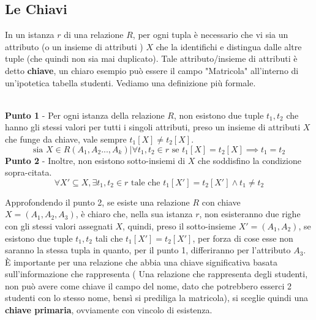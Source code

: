 \documentclass[12pt, letterpaper]{article}
\begin{document}
\subsection{Le Chiavi}
In un istanza \(r\) di una relazione \(R\), per ogni tupla è necessario che vi sia un attributo (o un insieme di attributi ) \(X\)
che la identifichi e distingua dalle altre tuple (che quindi non sia mai duplicato). Tale attributo/insieme di attributi è detto
\textbf{chiave}, un chiaro esempio può essere il campo "Matricola" all'interno di un'ipotetica tabella studenti.
Vediamo una definizione più formale.
\begin{theorem}
    \hphantom{.}\\\textbf{ Punto 1 }- Per ogni istanza della relazione \(R\), non esistono due tuple \(t_1,t_2\) che hanno gli stessi valori
    per tutti i singoli attributi, preso un insieme di attributi \(X\) che funge da chiave, vale sempre \(t_1[X]\ne t_2[X]\).
    \begin{equation}
        \text{sia }X\in R(A_1,A_2...,A_k) | \forall t_1,t_2 \in r \text{ se }t_1[X]=t_2[X] \implies t_1=t_2
    \end{equation}
    \textbf{ Punto 2 }- Inoltre, non esistono sotto-insiemi di \(X\) che soddisfino la condizione sopra-citata.
    \begin{equation}
        \forall X'\subseteq X, \exists t_1,t_2 \in r \text{ tale che } t_1[X']=t_2[X'] \land t_1 \ne t_2
    \end{equation}
\end{theorem}
Approfondendo il punto 2, se esiste una relazione \(R\) con chiave \(X=(A_1,A_2,A_3)\), è chiaro che, nella 
sua istanza \(r\), non esisteranno due righe con gli stessi valori assegnati \(X\), quindi, preso il sotto-insieme
\(X'=(A_1,A_2)\), se esistono due tuple \(t_1,t_2\) tali che \(t_1[X']=t_2[X']\), per forza di cose esse non 
saranno la stessa tupla in quanto, per il punto 1, differiranno per l'attributo \(A_3\).
È importante per una relazione che abbia una chiave significativa basata sull'informazione che rappresenta
( Una relazione che rappresenta degli studenti, non può avere come chiave il campo del nome, dato che potrebbero 
esserci 2 studenti con lo stesso nome, bensì si prediliga la matricola), si sceglie quindi una \textbf{chiave primaria},
ovviamente con vincolo di esistenza.
\end{document}
